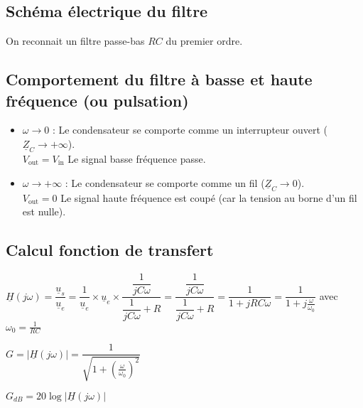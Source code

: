 \documentclass{article}
\begin{document}
\subsection{Schéma électrique du filtre}
On reconnait un filtre passe-bas $RC$ du premier ordre.


\vspace{2cm}
\subsection{Comportement du filtre à basse et haute fréquence (ou pulsation)}

\begin{itemize}[label=$\ast$]
    \item $\omega \rightarrow 0$ : Le condensateur se comporte comme un interrupteur ouvert ($\underline{Z}_C \rightarrow +\infty$).\\
        $V_{\text{out}}=V_{\text{in}}$ \quad Le signal basse fréquence passe.
    \item $\omega \rightarrow +\infty$ : Le condensateur se comporte comme un fil ($\underline{Z}_C \rightarrow 0$).\\
        $V_{\text{out}} = 0$ \quad Le signal haute fréquence est coupé (car la tension au borne d'un fil est nulle).
\end{itemize}

\subsection{Calcul fonction de transfert}

$\underline{H}(j\omega) = \dfrac{\underline{u}_s}{\underline{u}_e} =  \dfrac{1}{\underline{u}_e}\times\underline{u}_e \times \dfrac{\dfrac{1}{jC\omega}}{\dfrac{1}{jC\omega} + R} = \dfrac{\dfrac{1}{jC\omega}}{\dfrac{1}{jC\omega} + R} = \dfrac{1}{1+jRC\omega} = \dfrac{1}{1+j\frac{\omega}{\omega_0}}$
\quad avec $\omega_0=\frac{1}{RC}$

$G = \left|\underline{H}(j\omega)\right| = \dfrac{1}{\sqrt{1+\left(\frac{\omega}{\omega_0}\right)^2}}$

$G_{dB} = 20\log{\left|\underline{H}(j\omega)\right|} $
\end{document}
